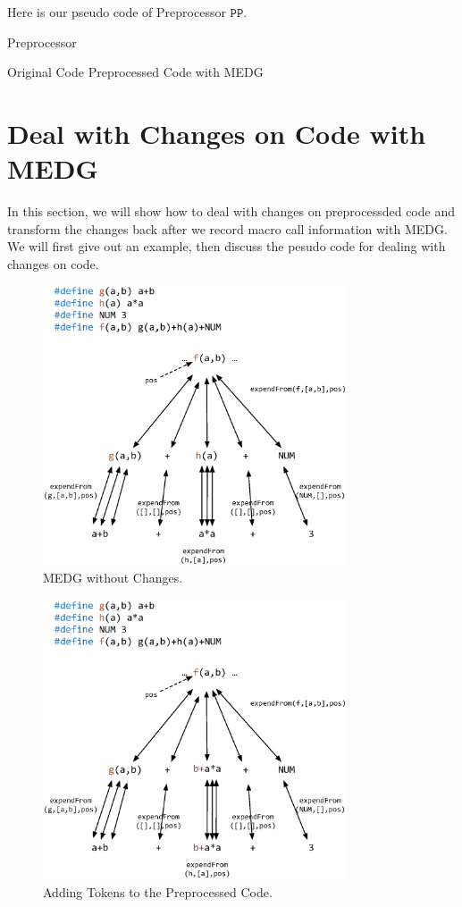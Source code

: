 \documentclass[11pt]{article}
\theoremstyle{theorem}
\theoremstyle{lemma}
\theoremstyle{property}
\theoremstyle{definition}
\theoremstyle{assumption}
\begin{document}
Here is our pseudo code of Preprocessor $\mathtt{PP}$. 

\begin{algorithm}
    \caption{Preprocessor}
    \begin{algorithmic}[1] 
        \Require Original Code
        \Ensure Preprocessed Code with MEDG
        \EndFunction
            
    \end{algorithmic}
\end{algorithm}
\newpage

\section{Deal with Changes on Code with MEDG}
In this section, we will show how to deal with changes on preprocessded code and transform the changes back after we record macro call information with MEDG. We will first give out an example, then discuss the pesudo code for dealing with changes on code.

\begin{figure}[H]
\centering
\includegraphics[width=9cm]{original.eps}
\caption{MEDG without Changes.}
\end{figure}

\begin{figure}[H]
\centering
\includegraphics[width=9cm]{add_case.eps}
\caption{Adding Tokens to the Preprocessed Code.}
\end{figure}
\end{document}
